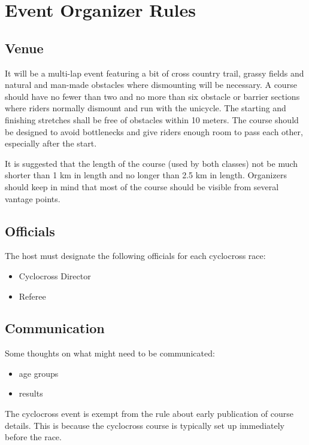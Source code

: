 \chapter{Event Organizer Rules}

\section{Venue}

It will be a multi-lap event featuring a bit of cross country trail, grassy fields and natural and man-made obstacles where dismounting will be necessary.
A course should have no fewer than two and no more than six obstacle or barrier sections where riders normally dismount and run with the unicycle.
The starting and finishing stretches shall be free of obstacles within 10 meters.
The course should be designed to avoid bottlenecks and give riders enough room to pass each other, especially after the start.

It is suggested that the length of the course (used by both classes) not be much shorter than 1 km in length and no longer than 2.5 km in length.
Organizers should keep in mind that most of the course should be visible from several vantage points.

\section{Officials}

The host must designate the following officials for each cyclocross race:
\begin{itemize}
\item Cyclocross Director
\item Referee
\end{itemize}

\section{Communication}

\begin{comment2016}
Some thoughts on what might need to be communicated:
\begin{itemize}
\item age groups
\item results
\end{itemize}
\end{comment2016}

The cyclocross event is exempt from the rule about early publication of course details.
This is because the cyclocross course is typically set up immediately before the race.


